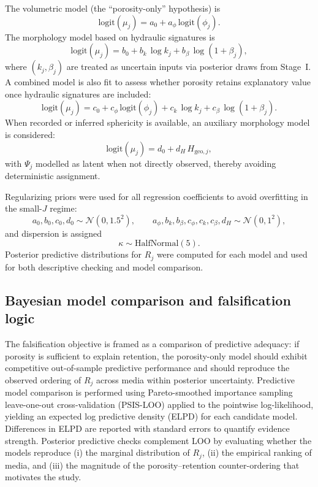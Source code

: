 \documentclass[12pt,a4paper]{article}
\begin{document}
The volumetric model (the ``porosity-only'' hypothesis) is
\begin{equation}
\mathrm{logit}(\mu_j)=a_0 + a_\phi\,\mathrm{logit}(\phi_j).
\end{equation}
The morphology model based on hydraulic signatures is
\begin{equation}
\mathrm{logit}(\mu_j)=b_0 + b_k\,\log k_j + b_\beta\,\log(1+\beta_j),
\end{equation}
where $(k_j,\beta_j)$ are treated as uncertain inputs via posterior draws from Stage~I. A combined model is also fit to assess whether porosity retains explanatory value once hydraulic signatures are included:
\begin{equation}
\mathrm{logit}(\mu_j)=c_0 + c_\phi\,\mathrm{logit}(\phi_j) + c_k\,\log k_j + c_\beta\,\log(1+\beta_j).
\end{equation}
When recorded or inferred sphericity is available, an auxiliary morphology model is considered:
\begin{equation}
\mathrm{logit}(\mu_j)=d_0 + d_H\,H_{\mathrm{geo},j},
\end{equation}
with $\Psi_j$ modelled as latent when not directly observed, thereby avoiding deterministic assignment.

Regularizing priors were used for all regression coefficients to avoid overfitting in the small-$J$ regime:
\begin{equation}
a_0,b_0,c_0,d_0 \sim \mathcal{N}(0,1.5^2), \qquad a_\phi,b_k,b_\beta,c_\phi,c_k,c_\beta,d_H \sim \mathcal{N}(0,1^2),
\end{equation}
and dispersion is assigned
\begin{equation}
\kappa \sim \mathrm{HalfNormal}(5).
\end{equation}
Posterior predictive distributions for $R_j$ were computed for each model and used for both descriptive checking and model comparison.

\subsection{Bayesian model comparison and falsification logic}
The falsification objective is framed as a comparison of predictive adequacy: if porosity is sufficient to explain retention, the porosity-only model should exhibit competitive out-of-sample predictive performance and should reproduce the observed ordering of $R_j$ across media within posterior uncertainty. Predictive model comparison is performed using Pareto-smoothed importance sampling leave-one-out cross-validation (PSIS-LOO) applied to the pointwise log-likelihood, yielding an expected log predictive density (ELPD) for each candidate model. Differences in ELPD are reported with standard errors to quantify evidence strength. Posterior predictive checks complement LOO by evaluating whether the models reproduce (i) the marginal distribution of $R_j$, (ii) the empirical ranking of media, and (iii) the magnitude of the porosity--retention counter-ordering that motivates the study.
\end{document}
